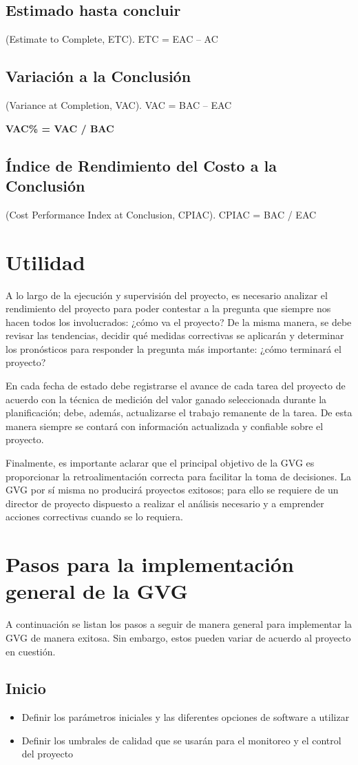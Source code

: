 \documentclass{article}
\newcommand*\rbreak{\par\noindent\linebreak}
\begin{document}
    \subsection{Estimado hasta concluir} (Estimate to Complete, ETC). ETC = EAC – AC
    \subsection{Variación a la Conclusión} (Variance at Completion, VAC). VAC = BAC – EAC \rbreak
    \bfseries{VAC\%} = VAC / BAC
    \subsection{Índice de Rendimiento del Costo a la Conclusión} (Cost Performance Index at Conclusion, CPIAC). CPIAC = BAC / EAC
    \section{Utilidad}
    A lo largo de la ejecución y supervisión del proyecto, es necesario analizar el rendimiento del proyecto para poder contestar
    a la pregunta que siempre nos hacen todos los involucrados: ¿cómo va el proyecto? De la misma manera, 
    se debe revisar las tendencias, decidir qué medidas correctivas se aplicarán y determinar los pronósticos 
    para responder la pregunta más importante: ¿cómo terminará el proyecto? \rbreak
    En cada fecha de estado debe registrarse el avance de cada tarea del proyecto de acuerdo con la
    técnica de medición del valor ganado seleccionada durante la planificación; debe, además, actualizarse el trabajo 
    remanente de la tarea. De esta manera siempre se contará con información actualizada y confiable sobre el proyecto.\rbreak
    Finalmente, es importante aclarar que el principal objetivo de la GVG es proporcionar la retroalimentación correcta 
    para facilitar la toma de decisiones. La GVG por sí misma no producirá proyectos exitosos; para ello se requiere de
    un director de proyecto dispuesto a realizar el análisis necesario y a emprender acciones correctivas cuando se lo requiera.
        \section{Pasos para la implementación general de la GVG}
        A continuación se listan los pasos a seguir de manera general para implementar la GVG de manera exitosa. Sin embargo, 
        estos pueden variar de acuerdo al proyecto en cuestión.
        \subsection{Inicio}
        \begin{itemize}
    \item Definir los parámetros iniciales y las diferentes opciones de software a utilizar
    \item Definir los umbrales de calidad que se usarán para el monitoreo y el control del proyecto
        \end{itemize}
\end{document}
